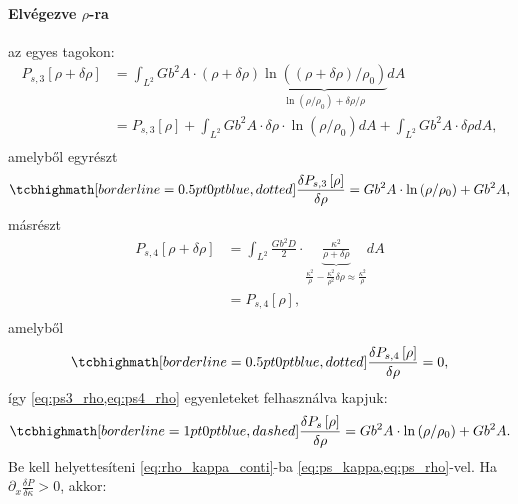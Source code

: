 \documentclass[10pt,a4paper]{scrartcl}
\begin{document}
\paragraph{Elvégezve $\rho$-ra} az egyes tagokon:
\[\begin{aligned}
  {P_{s,3}}\left[ {\rho  + \delta \rho } \right] &  = \int_{{L^2}} {G{b^2}A \cdot \left( {\rho  + \delta \rho } \right)\underbrace {\ln \left( {\left( {\rho  + \delta \rho } \right)/{\rho _0}} \right)}_{\ln \left( {\rho /{\rho _0}} \right) + \delta \rho /\rho }} dA \\ 
   &  = {P_{s,3}}\left[ \rho  \right] + \int_{{L^2}} {G{b^2}A \cdot \delta \rho  \cdot \ln \left( {\rho /{\rho _0}} \right)} dA + \int_{{L^2}} {G{b^2}A \cdot \delta \rho } dA, \\ 
\end{aligned} \]
amelyből egyrészt
\begin{equation} \label{eq:ps3_rho}
\tcbhighmath[borderline={0.5pt}{0pt}{blue,dotted}]{\frac{{{\delta P_{s,3}}\left[ \rho  \right]}}{{\delta \rho }} = G{b^2}A \cdot \ln \left( {\rho /{\rho _0}} \right) + G{b^2}A,}
\end{equation}
másrészt
\[\begin{aligned}
  {P_{s,4}}\left[ {\rho  + \delta \rho } \right] &  = \int_{{L^2}} {\frac{{G{b^2}D}}{2} \cdot \underbrace {\frac{{{\kappa ^2}}}{{\rho  + \delta \rho }}}_{\frac{{{\kappa ^2}}}{\rho } - \frac{{{\kappa ^2}}}{{{\rho ^2}}}\delta \rho \approx \frac{\kappa^2}{\rho }}} dA \\ 
   &  = {P_{s,4}}\left[ \rho  \right], \\ 
\end{aligned} \]
amelyből
\begin{equation} \label{eq:ps4_rho}
\tcbhighmath[borderline={0.5pt}{0pt}{blue,dotted}]{\frac{{{\delta P_{s,4}}\left[ \rho  \right]}}{{\delta \rho }} =  0,}
\end{equation}
így \cref{eq:ps3_rho,eq:ps4_rho} egyenleteket felhasználva kapjuk:
\begin{equation} \label{eq:ps_rho}
\tcbhighmath[borderline={1pt}{0pt}{blue,dashed}]{\frac{{{\delta P_s}\left[ \rho  \right]}}{{\delta \rho }} = G{b^2}A \cdot \ln \left( {\rho /{\rho _0}} \right) + G{b^2}A .}
\end{equation}
Be kell helyettesíteni \cref{eq:rho_kappa_conti}-ba \cref{eq:ps_kappa,eq:ps_rho}-vel. Ha ${{\partial _x}\frac{{\delta P}}{{\delta \kappa }}} > 0$, akkor:
\end{document}
